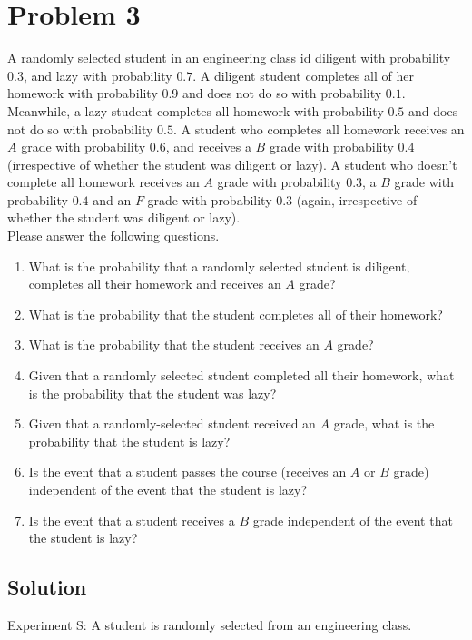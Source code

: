 \section{Problem 3}

A randomly selected student in an engineering class id diligent with probability $0.3$, and lazy with probability $0.7$. A diligent student completes all of her homework with probability $0.9$ and does not do so with probability $0.1$. Meanwhile, a lazy student completes all homework with probability $0.5$ and does not do so with probability $0.5$. A student who completes all homework receives an $A$ grade with probability $0.6$, and receives a $B$ grade with probability $0.4$ (irrespective of whether the student was diligent or lazy). A student who doesn't complete all homework receives an $A$ grade with probability $0.3$, a $B$ grade with probability $0.4$ and an $F$ grade with probability $0.3$ (again, irrespective of whether the student was diligent or lazy).\\
Please answer the following questions.\\

\begin{enumerate}[3a.]
	\item What is the probability that a randomly selected student is diligent, completes all their homework and receives an $A$ grade?
	\item What is the probability that the student completes all of their homework?
	\item What is the probability that the student receives an $A$ grade?
	\item Given that a randomly selected student completed all their homework, what is the probability that the student was lazy?
	\item Given that a randomly-selected student received an $A$ grade, what is the probability that the student is lazy?
	\item Is the event that a student passes the course (receives an $A$ or $B$ grade) independent of the event that the student is lazy?
	\item Is the event that a student receives a $B$ grade independent of the event that the student is lazy? 
\end{enumerate}

\subsection{Solution}

Experiment S: A student is randomly selected from an engineering class.

